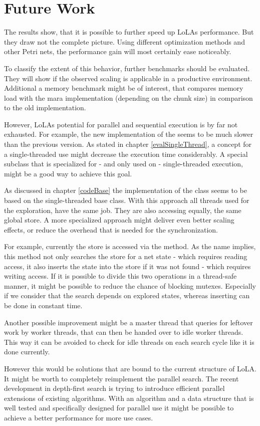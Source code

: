 \chapter{Future Work}
The results show, that it is possible to further speed up LoLAs performance. But they draw not the complete picture. Using different optimization methods and other Petri nets, the performance gain will most certainly ease noticeably.

To classify the extent of this behavior, further benchmarks should be evaluated. They will show if the observed scaling is applicable in a productive environment. Additional a memory benchmark might be of interest, that compares memory load with the mara implementation (depending on the chunk size) in comparison to the old implementation.

However, LoLAs potential for parallel and sequential execution is by far not exhausted. For example, the new implementation of the  seems to be much slower than the previous version. As stated in chapter \ref{evalSingleThread}, a concept for a single-threaded use might decrease the execution time considerably. A special subclass that is specialized for - and only used on - single-threaded execution, might be a good way to achieve this goal.

As discussed in chapter \ref{codeBase} the implementation of the  class seems to be based on the single-threaded base class. With this approach all threads used for the exploration, have the same job. They are also accessing equally, the same global store. A more specialized approach might deliver even better scaling effects, or reduce the overhead that is needed for the synchronization.

For example, currently the store is accessed via the  method. As the name implies, this method not only searches the store for a net state - which requires reading access, it also inserts the state into the store if it was not found - which requires writing access. If it is possible to divide this two operations in a thread-safe manner, it might be possible to reduce the chance of blocking mutexes. Especially if we consider that the search depends on explored states, whereas inserting can be done in constant time.

Another possible improvement might be a master thread that queries for leftover work by worker threads, that can then be handed over to idle worker threads. This way it can be avoided to check for idle threads on each search cycle like it is done currently.

However this would be solutions that are bound to the current structure of LoLA. It might be worth to completely reimplement the parallel search. The recent development in depth-first search is trying to introduce efficient parallel extensions of existing algorithms\cite{bloemen2016multi}\cite{holzmann2008stack}. With an algorithm and a data structure that is well tested and specifically designed for parallel use it might be possible to achieve a better performance for more use cases.